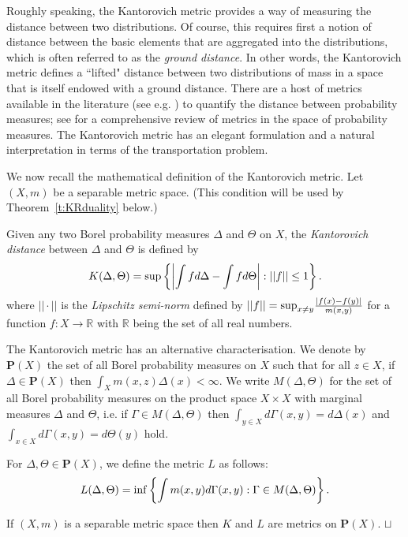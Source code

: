 \documentclass{article}
\newcommand\Real {{\mathbb R}}
\def \BP{\textbf{P}}
\def\squareforqed{\hbox{\rlap{$\sqcap$}$\sqcup$}}
\def\qed{\ifmmode\squareforqed\else{\unskip\nobreak\hfil
\penalty50\hskip1em\null\nobreak\hfil\squareforqed
\parfillskip=0pt\finalhyphendemerits=0\endgraf}\fi}
\begin{document}
Roughly speaking,  the Kantorovich metric provides a way of
measuring the distance between two distributions. Of course, this
requires first a notion of distance between the basic elements that
are aggregated into the distributions, which is often referred to as
the \emph{ground distance}. In other words, the Kantorovich metric
defines a ``lifted" distance between two distributions of mass in a
space that is itself endowed with a ground distance. There are a
host of metrics available in the literature (see e.g. \cite{GS02})
to quantify the distance between probability measures; see
\cite{Rac91} for a comprehensive review of metrics in the space of
probability measures. The Kantorovich metric has an elegant
formulation and a natural interpretation in terms of the
transportation problem.

We now recall the mathematical definition of the Kantorovich metric.
Let $(X,m)$ be a separable metric space. (This condition will be
used by Theorem~\ref{t:KRduality} below.)
\begin{definition}\label{d:K} Given any two Borel probability measures $\Delta$ and $\Theta$ on $X$, the \emph{Kantorovich distance} between
$\Delta$ and $\Theta$ is defined by
\[K(\Delta,\Theta)={\rm sup}\left\{\left|\int f d\Delta - \int f d\Theta\right|: ||f||\leq 1\right\}.\]
where $||\cdot||$ is the \emph{Lipschitz semi-norm} defined by
$||f||={\rm sup}_{x\not=y}\frac{|f(x)-f(y)|}{m(x,y)}$ for a function
$f:X\rightarrow \Real$ with $\Real$ being the set of all real
numbers.
\end{definition}

The Kantorovich metric has an alternative characterisation. We
denote by $\BP(X)$ the set of all Borel probability measures on $X$
such that for all $z\in X$, if $\Delta\in\BP(X)$ then $\int_X
m(x,z)\Delta(x)<\infty$. We write $M(\Delta,\Theta)$ for the set of
all Borel probability measures on the product space $X\times X$ with
marginal measures $\Delta$ and $\Theta$, i.e. if $\Gamma\in
M(\Delta,\Theta)$ then $\int_{y\in X} d\Gamma(x,y)=d\Delta(x)$ and
$\int_{x\in X} d\Gamma(x,y)=d\Theta(y)$ hold.
\begin{definition}\label{d:L}
For $\Delta,\Theta\in\BP(X)$, we define the metric $L$ as follows:
\[L(\Delta,\Theta)={\rm inf}\left\{\int m(x,y)d \Gamma(x,y): \Gamma\in M(\Delta,\Theta)\right\}.\]
\end{definition}


\begin{lemma}
If $(X,m)$ is a separable metric space then $K$ and $L$ are metrics
on $\BP(X)$. \hfill\qed
\end{lemma}
\end{document}
